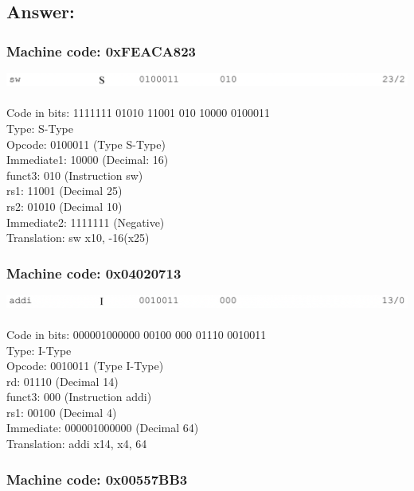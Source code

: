 \documentclass{article}
\begin{document}
\subsection*{Answer:}
\subsubsection*{Machine code: 0xFEACA823}

\includegraphics[scale=.3]{images/swq4.png}
\\\\
Code in bits: 1111111 01010 11001 010 10000 0100011\\
Type: S-Type\\
Opcode: 0100011 (Type S-Type)\\
Immediate1: 10000 (Decimal: 16)\\
funct3: 010 (Instruction sw)\\ 
rs1: 11001 (Decimal 25)\\
rs2: 01010 (Decimal 10)\\
Immediate2: 1111111 (Negative)\\
Translation: sw x10, -16(x25)\\

\subsubsection*{Machine code: 0x04020713}

\includegraphics[scale=.3]{images/addiq4.png}
\\\\
Code in bits: 000001000000 00100 000 01110 0010011\\
Type: I-Type\\
Opcode: 0010011 (Type I-Type)\\
rd: 01110 (Decimal 14)\\
funct3: 000 (Instruction addi)\\
rs1: 00100 (Decimal 4)\\
Immediate: 000001000000 (Decimal 64)\\
Translation: addi x14, x4, 64\\

\subsubsection*{Machine code: 0x00557BB3}
\end{document}
